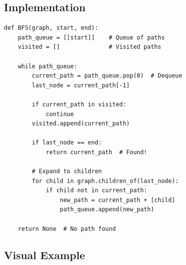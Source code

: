 \documentclass[11pt,a4paper]{report}
\begin{document}
\subsection{Implementation}

\begin{lstlisting}[style=pythonstyle, caption={BFS pseudocode}]
def BFS(graph, start, end):
    path_queue = [[start]]    # Queue of paths
    visited = []              # Visited paths
    
    while path_queue:
        current_path = path_queue.pop(0)  # Dequeue
        last_node = current_path[-1]
        
        if current_path in visited:
            continue
        visited.append(current_path)
        
        if last_node == end:
            return current_path  # Found!
        
        # Expand to children
        for child in graph.children_of(last_node):
            if child not in current_path:
                new_path = current_path + [child]
                path_queue.append(new_path)
    
    return None  # No path found
\end{lstlisting}

\subsection{Visual Example}
\end{document}
